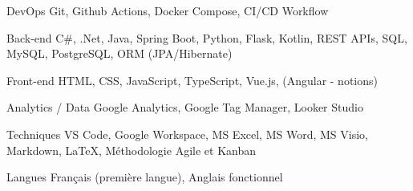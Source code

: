 
\begin{cvskills}
	
	\cvskill
	{DevOps} %
	{Git, Github Actions, Docker Compose, CI/CD Workflow} %
	
	\cvskill
	{Back-end} %
	{C\#, .Net, Java, Spring Boot, Python, Flask, Kotlin, REST APIs, SQL, MySQL, PostgreSQL, ORM (JPA/Hibernate)} %
	
	\cvskill
	{Front-end} %
	{HTML, CSS, JavaScript, TypeScript, Vue.js, (Angular - notions)} %
	
	\cvskill
	{Analytics / Data} %
	{Google Analytics, Google Tag Manager, Looker Studio} %
	
	\cvskill
	{Techniques} %
	{VS Code, Google Workspace, MS Excel, MS Word, MS Visio, Markdown, LaTeX, Méthodologie Agile et Kanban} %
	
	\cvskill
	{Langues} %
	{Français (première langue), Anglais fonctionnel} %
	
\end{cvskills}
